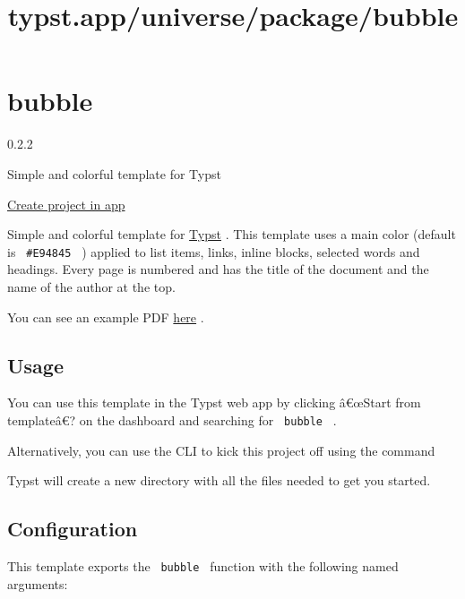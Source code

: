 \title{typst.app/universe/package/bubble}

\label{banner}
\label{template-thumbnail}

\section{bubble}\label{bubble}

{ 0.2.2 }

Simple and colorful template for Typst

\href{/app?template=bubble&version=0.2.2}{Create project in app}

\label{readme}
Simple and colorful template for \href{https://typst.app/}{Typst} . This
template uses a main color (default is \texttt{\ \#E94845\ } ) applied
to list items, links, inline blocks, selected words and headings. Every
page is numbered and has the title of the document and the name of the
author at the top.

You can see an example PDF
\href{https://github.com/hzkonor/bubble-template/blob/main/main.pdf}{here}
.

\subsection{Usage}\label{usage}

You can use this template in the Typst web app by clicking â€œStart from
templateâ€? on the dashboard and searching for \texttt{\ bubble\ } .

Alternatively, you can use the CLI to kick this project off using the
command

\begin{Shaded}
\begin{Highlighting}[]
\end{Highlighting}
\end{Shaded}

Typst will create a new directory with all the files needed to get you
started.

\subsection{Configuration}\label{configuration}

This template exports the \texttt{\ bubble\ } function with the
following named arguments:

